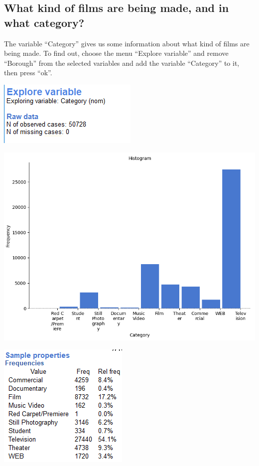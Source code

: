 \documentclass[
]{book}
\begin{document}
\hypertarget{what-kind-of-films-are-being-made-and-in-what-category}{%
\subsection{What kind of films are being made, and in what category?}\label{what-kind-of-films-are-being-made-and-in-what-category}}

The variable ``Category'' gives us some information about what kind of films are being made. To find out, choose the menu ``Explore variable'' and remove ``Borough'' from the selected variables and add the variable ``Category'' to it, then press ``ok''.

\includegraphics{img/ch1/expvar_rawdata_cases.png}

\includegraphics{img/ch1/expvar_hitogr(category).png}

\includegraphics{img/ch1/expvar_sampleprop(cat).png}
\end{document}
